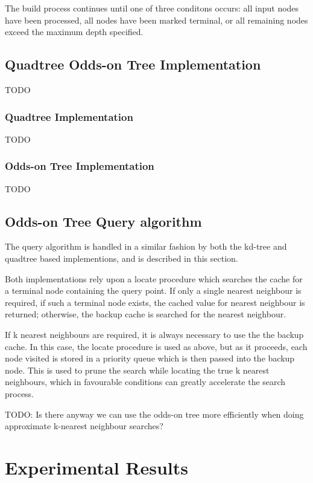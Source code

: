 \documentclass[mcs]{scsthesis}
\begin{document}
The build process continues until one of three conditons occurs: all input nodes
have been processed, all nodes have been marked terminal, or all remaining nodes
exceed the maximum depth specified.

\section{Quadtree Odds-on Tree Implementation}

TODO

\subsection{Quadtree Implementation}

TODO

\subsection{Odds-on Tree Implementation}

TODO

\section{Odds-on Tree Query algorithm}

The query algorithm is handled in a similar fashion by both the kd-tree and
quadtree based implementions, and is described in this section.

Both implementations rely upon a locate procedure which searches the cache for a
terminal node containing the query point. If only a single nearest neighbour
is required, if such a terminal node exists, the cached value for nearest
neighbour is returned; otherwise, the backup cache is searched for the
nearest neighbour.

If k nearest neighbours are required, it is always necessary to use the the
backup cache. In this case, the locate procedure is used as above, but as it
proceeds, each node visited is stored in a priority queue which is then passed
into the backup node. This is used to prune the search while locating the true
k nearest neighbours, which in favourable conditions can greatly accelerate
the search process.

TODO: Is there anyway we can use the odds-on tree more efficiently when doing
approximate k-nearest neighbour searches?

\chapter{Experimental Results}
\end{document}
